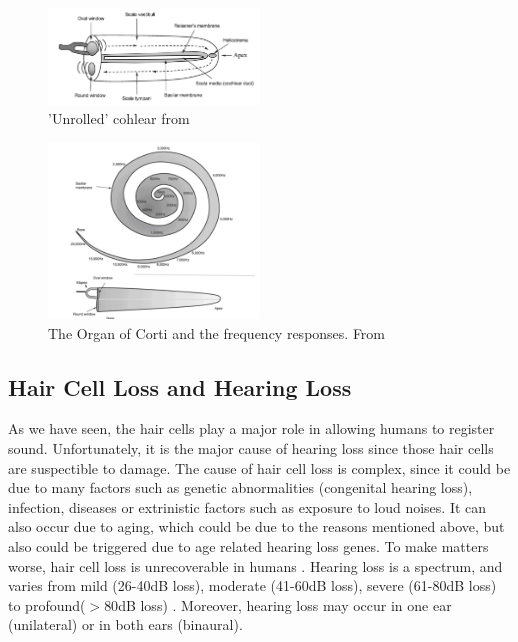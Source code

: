 \documentclass[logo,bsc,singlespacing,parskip,online]{infthesis}
\begin{document}
\begin{figure}[h]
   \centering
   \includegraphics[width=0.5\textwidth]{wayland-cohlear.png}
   \caption{'Unrolled' cohlear from \citet{Wayland2018Phonetics}}
   \label{fig:cohlear}
\end{figure}

\begin{figure}[h]
   \centering
   \includegraphics[width=0.5\textwidth]{wayland-corti.png}
   \caption{The Organ of Corti and the frequency responses. From \citet{Wayland2018Phonetics}}
   \label{fig:corti}
\end{figure}

\newpage

\subsection{Hair Cell Loss and Hearing Loss}
As we have seen, the hair cells play a major role in allowing humans to register sound. Unfortunately,
it is the major cause of hearing loss since those hair cells are suspectible to damage.
The cause of hair cell loss is complex, since it could be due to many factors such as 
genetic abnormalities (congenital hearing loss), infection, diseases or extrinistic factors such as exposure to loud noises.
It can also occur due to aging, which could be due to the reasons mentioned above, but also 
could be triggered due to age related hearing loss genes. To make matters worse, hair cell loss is unrecoverable in humans \cite{Furness2015HairCell}.
Hearing loss is a spectrum, and varies from mild (26-40dB loss), moderate (41-60dB loss), severe (61-80dB loss) to profound($>80$dB loss) \cite{Nieman2020HearingLoss}.
Moreover, hearing loss may occur in one ear (unilateral) or in both ears (binaural). 
\end{document}
